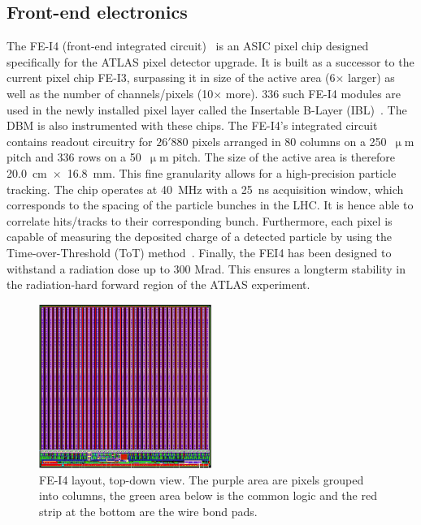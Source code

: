 \subsection{Front-end electronics}
The FE-I4 (front-end integrated circuit)~\cite{Albert:1477014} is an ASIC pixel chip designed specifically for the ATLAS pixel detector upgrade. It is built as a successor to the current pixel chip FE-I3, surpassing it in size of the active area (6$\times$ larger) as well as the number of channels/pixels (10$\times$ more). 336 such FE-I4 modules are used in the newly installed pixel layer called the Insertable B-Layer (IBL)~\cite{Huegging:1314083}. The DBM is also instrumented with these chips. The FE-I4's integrated circuit contains readout circuitry for $26'880$ pixels arranged in 80 columns on a 250~$\upmu$m pitch and 336 rows on a 50~$\upmu$m pitch. The size of the active area is therefore 20.0~cm~$\times$~16.8~mm. This fine granularity allows for a high-precision particle tracking. The chip operates at 40~MHz with a 25~ns acquisition window, which corresponds to the spacing of the particle bunches in the LHC. It is hence able to correlate hits/tracks to their corresponding bunch. Furthermore, each pixel is capable of measuring the deposited charge of a detected particle by using the Time-over-Threshold (ToT) method~\cite{1748-0221-7-11-P11010}. Finally, the FEI4 has been designed to withstand a radiation dose up to 300 Mrad. This ensures a longterm stability in the radiation-hard forward region of the ATLAS experiment.

\begin{figure}[!t]
\centering
\includegraphics[width=0.5\textwidth]{04_charge_monitoring/pics/fei41}
\caption{FE-I4 layout, top-down view. The purple area are pixels grouped into columns, the green area below is the common logic and the red strip at the bottom are the wire bond pads.}
\label{fig:anapix}
\end{figure}

